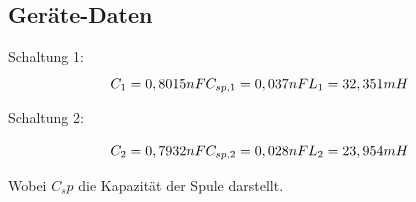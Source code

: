   \subsection{Geräte-Daten}
  Schaltung 1:
  \begin{equation*}
    C_1 = 0,8015nF \\
    C_{sp,1} = 0,037nF \\
    L_1 = 32,351mH \\
  \end{equation*}

  Schaltung 2:

  \begin{equation*}
    C_2 = 0,7932nF \\
    C_{sp,2} = 0,028nF \\
    L_2 = 23,954mH \\
  \end{equation*}

  Wobei $C_sp$ die Kapazität der Spule darstellt.
